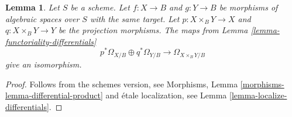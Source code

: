 \documentclass[10pt,a4paper]{amsart}
\theoremstyle{plain}
\newtheorem{lemma}[subsection]{Lemma}
\theoremstyle{definition}
\theoremstyle{remark}
\numberwithin{equation}{subsection}
\begin{document}
\begin{lemma}
\label{lemma-differential-product}
Let $S$ be a scheme.
Let $f : X \to B$ and $g : Y \to B$ be morphisms of algebraic spaces
over $S$ with the same target.
Let $p : X \times_B Y \to X$ and $q : X \times_B Y \to Y$ be the
projection morphisms. The maps from
Lemma \ref{lemma-functoriality-differentials}
$$
p^*\Omega_{X/B} \oplus q^*\Omega_{Y/B}
\longrightarrow
\Omega_{X \times_B Y/B}
$$
give an isomorphism.
\end{lemma}

\begin{proof}
Follows from the schemes version, see
Morphisms, Lemma \ref{morphisms-lemma-differential-product}
and \'etale localization, see
Lemma \ref{lemma-localize-differentials}.
\end{proof}
\end{document}

